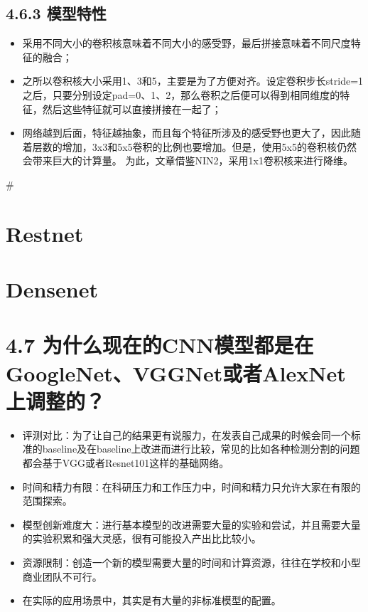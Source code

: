 \subsection{4.6.3 模型特性}\label{ux6a21ux578bux7279ux6027-4}

\begin{itemize}
\item
  采用不同大小的卷积核意味着不同大小的感受野，最后拼接意味着不同尺度特征的融合；
\item
  之所以卷积核大小采用1、3和5，主要是为了方便对齐。设定卷积步长stride=1之后，只要分别设定pad=0、1、2，那么卷积之后便可以得到相同维度的特征，然后这些特征就可以直接拼接在一起了；
\item
  网络越到后面，特征越抽象，而且每个特征所涉及的感受野也更大了，因此随着层数的增加，3x3和5x5卷积的比例也要增加。但是，使用5x5的卷积核仍然会带来巨大的计算量。
  为此，文章借鉴NIN2，采用1x1卷积核来进行降维。
\end{itemize}

\#

\section{Restnet}\label{restnet}

\section{Densenet}\label{densenet}

\section{4.7
为什么现在的CNN模型都是在GoogleNet、VGGNet或者AlexNet上调整的？}\label{ux4e3aux4ec0ux4e48ux73b0ux5728ux7684cnnux6a21ux578bux90fdux662fux5728googlenetvggnetux6216ux8005alexnetux4e0aux8c03ux6574ux7684}

\begin{itemize}
\item
  评测对比：为了让自己的结果更有说服力，在发表自己成果的时候会同一个标准的baseline及在baseline上改进而进行比较，常见的比如各种检测分割的问题都会基于VGG或者Resnet101这样的基础网络。
\item
  时间和精力有限：在科研压力和工作压力中，时间和精力只允许大家在有限的范围探索。
\item
  模型创新难度大：进行基本模型的改进需要大量的实验和尝试，并且需要大量的实验积累和强大灵感，很有可能投入产出比比较小。
\item
  资源限制：创造一个新的模型需要大量的时间和计算资源，往往在学校和小型商业团队不可行。
\item
  在实际的应用场景中，其实是有大量的非标准模型的配置。
\end{itemize}

